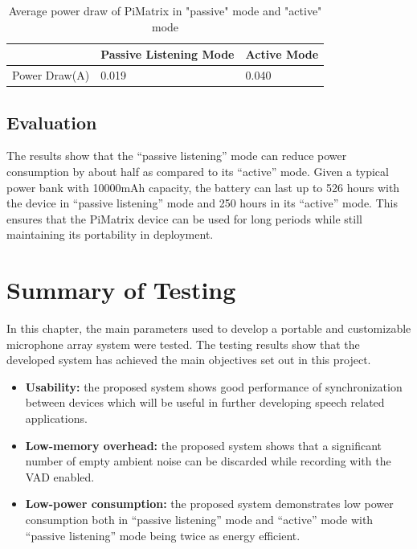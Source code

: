 \documentclass[hidelinks,12pt]{report} %
\begin{document}
\begin{table}[h]
\begin{center}
\begin{tabular}{|l|l|l|}
\hline
              & Passive Listening Mode & Active Mode \\ \hline
Power Draw(A) & 0.019                  & 0.040       \\ \hline
\end{tabular}
\label{tab:tablelabel}
\caption{Average power draw of PiMatrix in "passive" mode and "active" mode}
\end{center}
\end{table}

\subsection{Evaluation}

The results show that the “passive listening” mode can reduce power consumption by about half as compared to its “active” mode. Given a typical power bank with 10000mAh capacity, the battery can last up to 526 hours with the device in “passive listening” mode and 250 hours in its “active” mode. This ensures that the PiMatrix device can be used for long periods while still maintaining its portability in deployment.

\section{Summary of Testing}

In this chapter, the main parameters used to develop a portable and customizable microphone array system were tested. The testing results show that the developed system has achieved the main objectives set out in this project.

	\begin{itemize}
		\item{\textbf{Usability: }}
		the proposed system shows good performance of synchronization between devices which will be useful in further developing speech related applications.
	
		\item{\textbf{Low-memory overhead: }}
		the proposed system shows that a significant number of empty ambient noise can be discarded while recording with the VAD enabled. 

		\item{\textbf{Low-power consumption: }}
		the proposed system demonstrates low power consumption both in “passive listening” mode and “active” mode with “passive listening” mode being twice as energy efficient.

	
		
	\end{itemize}
\end{document}
